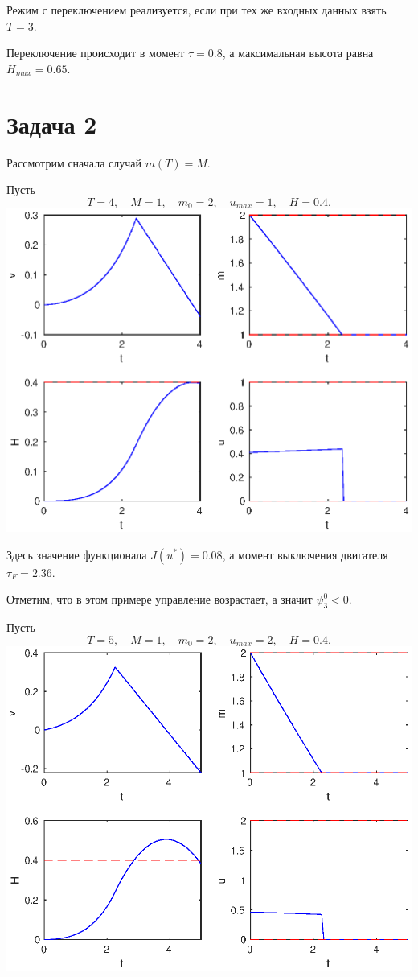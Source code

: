 \documentclass[16pt]{article}
\begin{document}
Режим с переключением реализуется, если при тех же входных данных взять $T = 3$.

Переключение происходит в момент $\tau = 0.8$, а максимальная высота равна $H_{max} = 0.65$.
\newpage
\section{Задача 2}

Рассмотрим сначала случай $m(T) = M$.

Пусть 
$$T = 4, \quad M = 1, \quad m_0 = 2, \quad u_{max} = 1, \quad H = 0.4.$$
\includegraphics[width=160mm]{2F+.eps}

Здесь значение функционала $J(u^*) = 0.08$, а момент выключения двигателя $\tau_F = 2.36$.

Отметим, что в этом примере управление возрастает, а значит $\psi_3^0 < 0$.

\newpage 
Пусть 
$$T = 5, \quad M = 1, \quad m_0 = 2, \quad u_{max} = 2, \quad H = 0.4.$$
\includegraphics[width=160mm]{2F-.eps}
\end{document}

